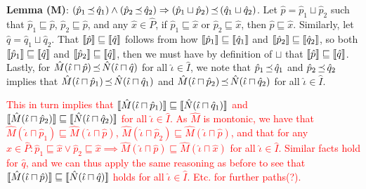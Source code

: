 
\textbf{Lemma (M)}: $(\hat p_{1} \operatorname{\mathrel{\preceq}} \hat q_{1}) \wedge (\hat p_{2} \operatorname{\mathrel{\preceq}} \hat q_{2}) \Rightarrow (\hat p_{1} \sqcup \hat p_{2}) \operatorname{\mathrel{\preceq}} \, (\hat q_{1} \sqcup \hat q_{2})$. Let $\hat p = \hat p_{1} \sqcup \hat p_{2}$ such that $\hat p_{1} \sqsubseteq \hat p$, $\hat p_{2} \sqsubseteq \hat p$, and any $\hat x \in \hat P$, if $\hat p_{1} \sqsubseteq \hat x$ or $\hat p_{2} \sqsubseteq \hat x$, then $\hat p \sqsubseteq \hat x$. Similarly, let $\hat q = \hat q_{1} \sqcup \hat q_{2}$. That $\llbracket\hat p\rrbracket \sqsubseteq \llbracket\hat q\rrbracket$ follows from how $\llbracket\hat p_{1}\rrbracket \sqsubseteq \llbracket\hat q_{1}\rrbracket$ and $\llbracket\hat p_{2}\rrbracket \sqsubseteq \llbracket\hat q_{2}\rrbracket$, so both $\llbracket\hat p_{1}\rrbracket \sqsubseteq \llbracket\hat q\rrbracket$ and $\llbracket\hat p_{2}\rrbracket \sqsubseteq \llbracket\hat q\rrbracket$, then we must have by definition of $\sqcup$ that $\llbracket\hat p\rrbracket \sqsubseteq \llbracket\hat q\rrbracket$. Lastly, for $\hat M(\hat \iota \sqcap \hat p) \operatorname{\mathrel{\preceq}} \hat N(\hat \iota \sqcap \hat q)$ for all $\hat \iota \in \hat I$, we note that $\hat p_{1} \operatorname{\mathrel{\preceq}} \hat q_{1}$ and $\hat p_{2} \operatorname{\mathrel{\preceq}} \hat q_{2}$ implies that $\hat M(\hat \iota \sqcap \hat p_{1}) \operatorname{\mathrel{\preceq}} \hat N(\hat \iota \sqcap \hat q_{1})$ and $\hat M(\hat \iota \sqcap \hat p_{2}) \operatorname{\mathrel{\preceq}} \hat N(\hat \iota \sqcap \hat q_{2})$ for all $\hat \iota \in \hat I$.


\textcolor{red}{This in turn implies that $\llbracket\hat M(\hat \iota \sqcap \hat p_{1})\rrbracket \sqsubseteq \llbracket\hat N(\hat \iota \sqcap \hat q_{1})\rrbracket$ and $\llbracket\hat M(\hat \iota \sqcap \hat p_{2})\rrbracket \sqsubseteq \llbracket\hat N(\hat \iota \sqcap \hat q_{2})\rrbracket$ for all $\hat \iota \in \hat I$. As $\hat M$ is montonic, we have that $\hat M(\hat \iota \sqcap \hat p_{1}) \sqsubseteq \hat M(\hat \iota \sqcap \hat p)$, $\hat M(\hat \iota \sqcap \hat p_{2}) \sqsubseteq \hat M(\hat \iota \sqcap \hat p)$, and that for any $\hat x \in \hat P : \hat p_{1} \sqsubseteq \hat x \vee \hat p_{2} \sqsubseteq \hat x \implies \hat M(\hat \iota \sqcap \hat p) \sqsubseteq \hat M(\hat \iota \sqcap \hat x)$ for all $\hat \iota \in \hat I$. Similar facts hold for $\hat q$, and we can thus apply the same reasoning as before to see that $\llbracket\hat M(\hat \iota \sqcap \hat p)\rrbracket \sqsubseteq \llbracket\hat N(\hat \iota \sqcap \hat q)\rrbracket$ holds for all $\hat \iota \in \hat I$. Etc. for further paths(?).}

